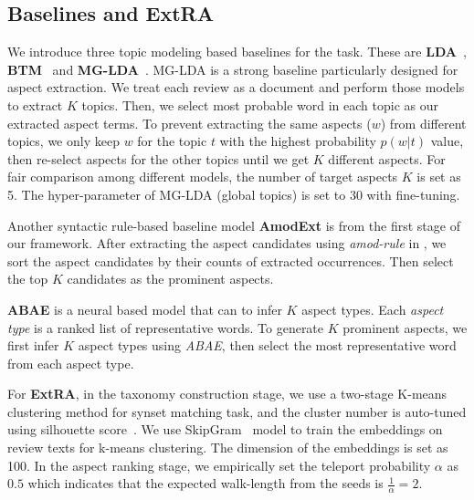 \subsection{Baselines and ExtRA}
\label{sec:base}
We introduce three topic modeling based baselines for the task.
These are \textbf{LDA}~\cite{Blei2003LatentDA}, 
\textbf{BTM}~\cite{cheng2014btm} and  
\textbf{MG-LDA}~\cite{titov2008modeling}. MG-LDA is a strong
baseline particularly designed for aspect extraction.
We treat each review as a document and perform those models
to extract $K$ topics.
Then, we select most probable word in 
each topic as our extracted aspect terms. 
To prevent extracting the same aspects ($w$) from different topics, 
we only keep $w$ for the topic $t$ with the highest 
probability $p(w|t)$ value, then re-select aspects for the other 
topics until we get $K$ different aspects. 
For fair comparison among different models, the number of 
target aspects $K$ is set as 5. The hyper-parameter of 
MG-LDA (global topics) is set to 30 with fine-tuning.

Another syntactic rule-based baseline model 
\textbf{AmodExt} is from the first stage of our framework. 
After extracting the aspect candidates using
\emph{amod-rule} in , 
we sort the aspect candidates by 
their counts of extracted occurrences. 
Then select the top $K$ 
candidates as the prominent aspects.

\textbf{ABAE} is a neural based model that can
to infer $K$ aspect types. 
Each \emph{aspect type} is a ranked list of representative words.
To generate $K$ prominent aspects, 
we first infer $K$ aspect types using \emph{ABAE}, 
then select the most representative word from each
aspect type. 

For \textbf{ExtRA}, in the taxonomy construction stage, 
we use a two-stage K-means clustering method for synset matching task, 
and the cluster number
is auto-tuned using silhouette score~\cite{rousseeuw1987silhouettes}.
We use SkipGram~\cite{miko} model to train the embeddings
on review texts for k-means clustering. 
The dimension of the embeddings is set as 100. 
In the aspect ranking stage, 
we empirically set the teleport probability $\alpha$
as $0.5$ which indicates that the expected walk-length
from the seeds is $\frac{1}{\alpha}=2$.


